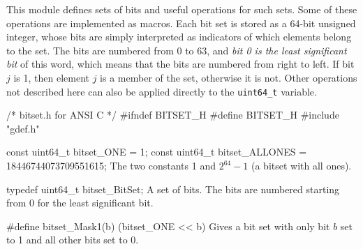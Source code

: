 
This module defines sets of bits and useful operations for such sets.
Some of these operations are implemented as macros.
Each bit set is stored as a 64-bit unsigned integer, whose bits are simply interpreted
as indicators of which elements belong to the set.
The bits are numbered from 0 to 63, and 
\emph{bit 0 is the least significant bit} of this word,
which means that the bits are numbered from right to left.
%
If bit $j$ is 1, then element $j$ is a member of the set, otherwise it is not.
Other operations not described here can also be applied directly
to the \texttt{uint64\_t} variable. 


\code\hide
/* bitset.h  for ANSI C */
#ifndef BITSET_H
#define BITSET_H
#include "gdef.h"
\endhide\endcode


\code

const uint64_t bitset_ONE = 1;
const uint64_t bitset_ALLONES = 18446744073709551615;   
\endcode
\tab
  The two constants 1 and $2^{64}-1$ (a bitset with all ones).
\endtab
\iffalse  %
\code

extern uint64_t bitset_MASK1[];
\endcode
 \tab {\tt bitset\_MASK1[j]} has only \emph{bit} $j$ set to 1 and all other 
  bits set to 0. 
  \pierre{Not sure if it is worthwhile to store and retrieve all these constants. 
	  See \url{http://c-faq.com/misc/bitsets.html} and 
    \url{https://github.com/iplinux/x11proto-trap/blob/master/xtrapbits.h}
		for alternatives.}
 \endtab
\code

extern uint64_t bitset_MASK[];
\endcode
 \tab {\tt bitset\_MASK[j]} has all \emph{the first $j$ bits} set to 1 and all other 
  bits set to 0.  
 \endtab
\fi  %

\code

typedef uint64_t bitset_BitSet;
\endcode
 \tab  A set of bits. The bits are numbered starting from 0 for the least significant bit. 
 \endtab



\code

#define bitset_Mask1(b) (bitset_ONE << b)
\endcode
 \tab Gives a bit set with only bit $b$ set to 1 and all other bits set to 0. 
 \endtab
\code

